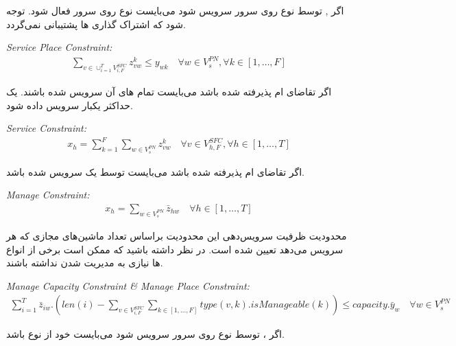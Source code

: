 اگر , 
توسط  نوع 
روی سرور  سرویس شود می‌بایست
 نوع 
روی سرور  فعال شود.
توجه شود که
اشتراک گذاری ها پشتیبانی نمی‌گردد.

\begin{latin}
    \textit{Service Place Constraint:}
    \begin{align}
        \sum_{v \in \cup_{i=1}^T V_{i, F}^{SFC}} z_{vw}^k \le y_{wk}
        \quad
        \forall w \in V_s^{PN}, \forall k \in [1,\ldots, F]
    \end{align}
\end{latin}

اگر تقاضای ام پذیرفته شده باشد
می‌بایست تمام های آن‌
سرویس شده باشند.
یک  حداکثر یکبار سرویس داده شود.

\begin{latin}
    \textit{Service Constraint:}
    \begin{align}
        x_h = \sum_{k=1}^{F} \sum_{w \in V_{s}^{PN}} z_{vw}^{k}
        \quad
        \forall v \in V_{h,F}^{SFC}, \forall h \in [1,\ldots, T]
    \end{align}
\end{latin}

اگر تقاضای ام پذیرفته شده باشد
می‌بایست توسط یک  سرویس شده باشد.

\begin{latin}
    \textit{Manage Constraint:}
    \begin{align}
        x_h = \sum_{w \in V_{s}^{PN}} \bar{z}_{hw}
        \quad
        \forall h \in [1,\ldots, T]
    \end{align}
\end{latin}

محدودیت ظرفیت سرویس‌دهی 
این محدودیت براساس تعداد ماشین‌های مجازی که هر
سرویس می‌دهد تعیین شده است.
در نظر داشته باشید که ممکن است برخی از انواع
‌ها
نیازی به مدیریت شدن نداشته باشند.

\begin{latin}
    \textit{Manage Capacity Constraint \& Manage Place Constraint:}
    \begin{align}
        \sum_{i=1}^{T} \bar{z}_{iw} . (len(i) - \sum_{v \in V_{i, F}^{SFC}} \sum_{k \in [1, \dots, F]} type(v, k) . isManageable(k)) \le capacity . \bar{y}_{w}
        \quad
        \forall w \in V_{s}^{PN}
    \end{align}
\end{latin}

اگر ،  توسط
نوع  روی سرور 
سرویس شود می‌بایست خود از نوع  باشد.

